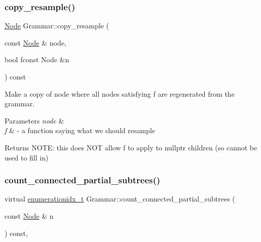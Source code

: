 \mbox{\label{class_grammar_ad6333cce88a2fe7ce56a897a6a930c28}} 
\subsubsection{\texorpdfstring{copy\+\_\+resample()}{copy\_resample()}}
{\footnotesize\ttfamily \hyperlink{class_node}{Node} Grammar\+::copy\+\_\+resample (\begin{DoxyParamCaption}\item[{const \hyperlink{class_node}{Node} \&}]{node,  }\item[{bool }]{fconst Node \&n }\end{DoxyParamCaption}) const\hspace{0.3cm}{\ttfamily [inline]}}

Make a copy of node where all nodes satisfying f are regenerated from the grammar. 
\begin{DoxyParams}{Parameters}
{\em node} & \\
\hline
{\em f} & -\/ a function saying what we should resample \\
\hline
\end{DoxyParams}
\begin{DoxyReturn}{Returns}
N\+O\+TE\+: this does N\+OT allow f to apply to nullptr children (so cannot be used to fill in)
\end{DoxyReturn}
\mbox{\label{class_grammar_ad56da50581cbebe1427ebf2f73018328}} 
\subsubsection{\texorpdfstring{count\+\_\+connected\+\_\+partial\+\_\+subtrees()}{count\_connected\_partial\_subtrees()}}
{\footnotesize\ttfamily virtual \hyperlink{_numerics_8h_a9fe2bbca873b046b2bd276fc6856bb88}{enumerationidx\+\_\+t} Grammar\+::count\+\_\+connected\+\_\+partial\+\_\+subtrees (\begin{DoxyParamCaption}\item[{const \hyperlink{class_node}{Node} \&}]{n }\end{DoxyParamCaption}) const\hspace{0.3cm}{\ttfamily [inline]}, {\ttfamily [virtual]}}


